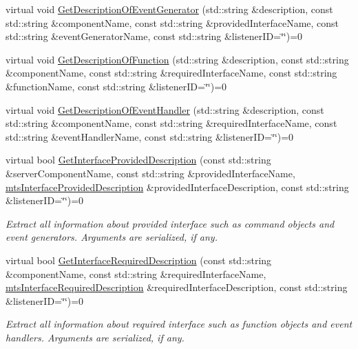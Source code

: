 \begin{DoxyCompactItemize}
\item 
virtual void \hyperlink{classmts_manager_local_interface_a96d45da8fb3ece61b6c99504c74df114}{Get\-Description\-Of\-Event\-Generator} (std\-::string \&description, const std\-::string \&component\-Name, const std\-::string \&provided\-Interface\-Name, const std\-::string \&event\-Generator\-Name, const std\-::string \&listener\-I\-D=\char`\"{}\char`\"{})=0
\item 
virtual void \hyperlink{classmts_manager_local_interface_a70d67480d63eafe650906d87a255f612}{Get\-Description\-Of\-Function} (std\-::string \&description, const std\-::string \&component\-Name, const std\-::string \&required\-Interface\-Name, const std\-::string \&function\-Name, const std\-::string \&listener\-I\-D=\char`\"{}\char`\"{})=0
\item 
virtual void \hyperlink{classmts_manager_local_interface_acf03d1240b5f0ba5637cd32fdd03ecaa}{Get\-Description\-Of\-Event\-Handler} (std\-::string \&description, const std\-::string \&component\-Name, const std\-::string \&required\-Interface\-Name, const std\-::string \&event\-Handler\-Name, const std\-::string \&listener\-I\-D=\char`\"{}\char`\"{})=0
\item 
virtual bool \hyperlink{classmts_manager_local_interface_a2a3db8231dd1d120d07352f90c55abd9}{Get\-Interface\-Provided\-Description} (const std\-::string \&server\-Component\-Name, const std\-::string \&provided\-Interface\-Name, \hyperlink{classmts_interface_provided_description}{mts\-Interface\-Provided\-Description} \&provided\-Interface\-Description, const std\-::string \&listener\-I\-D=\char`\"{}\char`\"{})=0
\begin{DoxyCompactList}\small\item\em Extract all information about provided interface such as command objects and event generators. Arguments are serialized, if any. \end{DoxyCompactList}\item 
virtual bool \hyperlink{classmts_manager_local_interface_a3010191948ef1402d231eb94af75b51b}{Get\-Interface\-Required\-Description} (const std\-::string \&component\-Name, const std\-::string \&required\-Interface\-Name, \hyperlink{classmts_interface_required_description}{mts\-Interface\-Required\-Description} \&required\-Interface\-Description, const std\-::string \&listener\-I\-D=\char`\"{}\char`\"{})=0
\begin{DoxyCompactList}\small\item\em Extract all information about required interface such as function objects and event handlers. Arguments are serialized, if any. \end{DoxyCompactList}\end{DoxyCompactItemize}


